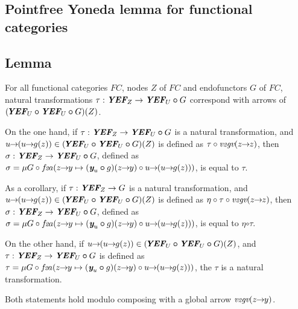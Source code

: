 \documentclass[11pt]{article}
\newcommand{\y}{\mbox{\bf {\em y}}}
\newcommand{\bcirc}{\bm{\circ}}
\newcommand{\YEF}{\mbox{\bf {\em YEF}}}
\newcommand{\fta}{\mbox{$f$\!{\scriptsize {\em 2}}$a$}}
\newcommand{\vtgv}{\mbox{{\normalsize {\em v}}{\scriptsize {\em 2}}{\normalsize {\em gv}}}}
\newcommand{\arrow}[2]{#1\!\!\rightarrow\!\!#2}
\newcommand{\lemm}{\subsection{Lemma}\begingroup\rm}
\def\edefn{\endgroup\par\pagebreak[2]\addvspace{\medskipamount}}
\let\elemm=\edefn
\begin{document}
\subsection{Pointfree Yoneda lemma for functional categories}

\lemm\label{Pointfree Yoneda lemma for functional categories}

For all functional categories $F\!C$, nodes $Z$ of $F\!C$ and endofunctors $G$ of $F\!C$, natural transformations
$\tau: \YEF_{Z} \rightarrow \YEF_{U} \bcirc G$ correspond with arrows of $(\!\YEF_{U} \bcirc \YEF_{U} \bcirc G)(Z)$.

On the one hand, if $\tau: \YEF_{Z} \rightarrow \YEF_{U} \bcirc G$ is a natural transformation, and
$\arrow{u}{(\arrow{u}{g(z)})} \in (\!\YEF_{U} \bcirc \YEF_{U} \bcirc G)(Z)$ is defined as
$\tau \circ \vtgv(\arrow{z}{z})$, then $\sigma: \YEF_{Z} \rightarrow \YEF_{U} \bcirc G$, defined as
$\sigma = \mu G \circ \fta(\arrow{z}{y} \mapsto (\y_{u} \bcirc g)(\arrow{z}{y}) \circ \arrow{u}{(\arrow{u}{g(z)})})$, is
equal to $\tau$. 

As a corollary, if $\tau: \YEF_{Z} \rightarrow G$ is a natural transformation, and
$\arrow{u}{(\arrow{u}{g(z)})} \in (\!\YEF_{U} \bcirc \YEF_{U} \bcirc G)(Z)$ is defined as
$\eta \circ \tau \circ \vtgv(\arrow{z}{z})$, then $\sigma: \YEF_{Z} \rightarrow \YEF_{U} \bcirc G$, defined as
$\sigma = \mu G \circ \fta(\arrow{z}{y} \mapsto (\y_{u} \bcirc g)(\arrow{z}{y}) \circ \arrow{u}{(\arrow{u}{g(z)})})$, is
equal to $\eta \bcirc \tau$. 

On the other hand, if $\arrow{u}{(\arrow{u}{g(z)})} \in (\!\YEF_{U} \bcirc \YEF_{U} \bcirc G)(Z)$, and
$\tau: \YEF_{Z} \rightarrow \YEF_{U} \bcirc G$ is defined as
$\tau = \mu G \circ \fta(\arrow{z}{y} \mapsto (\y_{u} \bcirc g)(\arrow{z}{y}) \circ \arrow{u}{(\arrow{u}{g(z)})})$, the
$\tau$ is a natural transformation.
\elemm

Both statements hold modulo composing with a global arrow $\vtgv(\arrow{z}{y})$.

\clearpage
\end{document}
